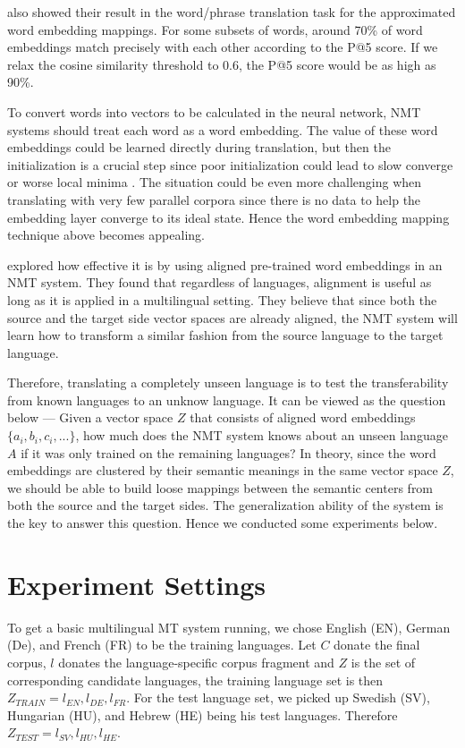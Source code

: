 \documentclass[thesis,fonts=libertine]{cluu}
\begin{document}
\textcite{Mikolov:2013ac} also showed their result in the word/phrase translation task for the approximated word embedding mappings. For some subsets of words, around 70\% of word embeddings match precisely with each other according to the P@5 score. If we relax the cosine similarity threshold to 0.6, the P@5 score would be as high as 90\%.

To convert words into vectors to be calculated in the neural network, NMT systems should treat each word as a word embedding. The value of these word embeddings could be learned directly during translation, but then the initialization is a crucial step since poor initialization could lead to slow converge or worse local minima \parencite{glorot2010understanding}. The situation could be even more challenging when translating with very few parallel corpora since there is no data to help the embedding layer converge to its ideal state. Hence the word embedding mapping technique above becomes appealing.

\textcite{Qi:2018aa} explored how effective it is by using aligned pre-trained word embeddings in an NMT system. They found that regardless of languages, alignment is useful as long as it is applied in a multilingual setting. They believe that since both the source and the target side vector spaces are already aligned, the NMT system will learn how to transform a similar fashion from the source language to the target language.

Therefore, translating a completely unseen language is to test the transferability from known languages to an unknow language. It can be viewed as the question below --- Given a vector space $Z$ that consists of aligned word embeddings $\{a_i, b_i, c_i, ...\}$, how much does the NMT system knows about an unseen language $A$ if it was only trained on the remaining languages? In theory, since the word embeddings are clustered by their semantic meanings in the same vector space $Z$, we should be able to build loose mappings between the semantic centers from both the source and the target sides. The generalization ability of the system is the key to answer this question. Hence we conducted some experiments below.

\section{Experiment Settings}
\label{sec:initial_exp_settings}

To get a basic multilingual MT system running, we chose English (EN), German (De), and French (FR) to be the training languages. Let $C$ donate the final corpus, $l$ donates the language-specific corpus fragment and $Z$ is the set of corresponding candidate languages, the training language set is then $Z_{TRAIN} = {l_{EN}, l_{DE}, l_{FR}}$. For the test language set, we picked up Swedish (SV), Hungarian (HU), and Hebrew (HE) being his test languages. Therefore $Z_{TEST} = {l_{SV}, l_{HU}, l_{HE}}$.
\end{document}
